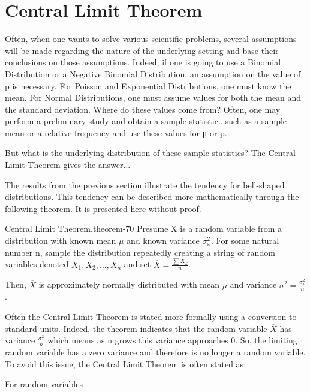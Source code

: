 \documentclass[10pt,]{book}
\numberwithin{equation}{section}
\begin{document}
\section[{Central Limit Theorem}]{Central Limit Theorem}\label{section-62}
\hypertarget{p-1217}{}%
Often, when one wants to solve various scientific problems, several assumptions will be made regarding the nature of the underlying setting and base their conclusions on those assumptions.  Indeed, if one is going to use a Binomial Distribution or a Negative Binomial Distribution, an assumption on the value of p is necessary.  For Poisson and Exponential Distributions, one must know the mean.  For Normal Distributions, one must assume values for both the mean and the standard deviation.   Where do these values come from?  Often, one may perform a preliminary study and obtain a sample statistic...such as a sample mean or a relative frequency and use these values for μ or p.%
\par
\hypertarget{p-1218}{}%
But what is the underlying distribution of these sample statistics?  The Central Limit Theorem gives the answer...%
\par
\hypertarget{p-1219}{}%
The results from the previous section illustrate the tendency for bell-shaped distributions. This tendency can be described more mathematically through the following theorem. It is presented here without proof.%
\begin{theorem}{Central Limit Theorem.}{}{theorem-70}%
\hypertarget{p-1220}{}%
Presume X is a random variable from a distribution with known mean \(\mu\) and known variance \(\sigma_x^2\). For some natural number n, sample the distribution repeatedly creating a string of random variables denoted \(X_1, X_2, ... , X_n\) and set \(\overline{X} = \frac{\sum X_k}{n}\).%
\par
\hypertarget{p-1221}{}%
Then, \(\overline{X}\) is approximately normally distributed with mean \(\mu\) and variance \(\sigma^2 = \frac{\sigma_x^2}{n}\).%
\end{theorem}
\hypertarget{p-1222}{}%
Often the Central Limit Theorem is stated more formally using a conversion to standard units. Indeed, the theorem indicates that the random variable \(\overline{X}\) has variance \(\frac{\sigma^2}{n}\) which means as n grows this variance approaches 0. So, the limiting random variable has a zero variance and therefore is no longer a random variable. To avoid this issue, the Central Limit Theorem is often stated as:%
\par
\hypertarget{p-1223}{}%
For random variables%
\end{document}
